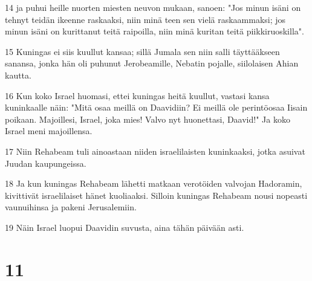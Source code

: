 \par 14 ja puhui heille nuorten miesten neuvon mukaan, sanoen: "Jos minun isäni on tehnyt teidän ikeenne raskaaksi, niin minä teen sen vielä raskaammaksi; jos minun isäni on kurittanut teitä raipoilla, niin minä kuritan teitä piikkiruoskilla".
\par 15 Kuningas ei siis kuullut kansaa; sillä Jumala sen niin salli täyttääkseen sanansa, jonka hän oli puhunut Jerobeamille, Nebatin pojalle, siilolaisen Ahian kautta.
\par 16 Kun koko Israel huomasi, ettei kuningas heitä kuullut, vastasi kansa kuninkaalle näin: "Mitä osaa meillä on Daavidiin? Ei meillä ole perintöosaa Iisain poikaan. Majoillesi, Israel, joka mies! Valvo nyt huonettasi, Daavid!" Ja koko Israel meni majoillensa.
\par 17 Niin Rehabeam tuli ainoastaan niiden israelilaisten kuninkaaksi, jotka asuivat Juudan kaupungeissa.
\par 18 Ja kun kuningas Rehabeam lähetti matkaan verotöiden valvojan Hadoramin, kivittivät israelilaiset hänet kuoliaaksi. Silloin kuningas Rehabeam nousi nopeasti vaunuihinsa ja pakeni Jerusalemiin.
\par 19 Näin Israel luopui Daavidin suvusta, aina tähän päivään asti.

\chapter{11}

